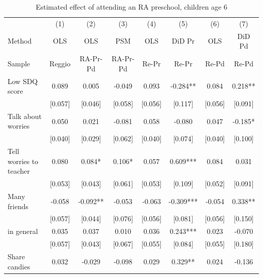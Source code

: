 \documentclass[12pt]{article}
\begin{document}
\begin{table}[ht]
\caption{Estimated effect of attending an RA preschool, children age 6}
\label{tab:childPS}
\begin{center}
\begin{adjustbox}{width=1.2\textwidth,center=\textwidth}
\small
\begin{tabular}{lccccccc}
\hline 
 & {(1) } & {(2) } & {(3) } & {(4) } & {(5) } & {(6) } & {(7) }\\
{Method } & {OLS } & {OLS } & {PSM } & {OLS } & {DiD Pr } & {OLS } & {DiD Pd }\\
{Sample } & {Reggio } & {RA-Pr-Pd } & {RA-Pr-Pd } & {Re-Pr } & {Re-Pr } & {Re-Pd } & {Re-Pd }\\
\hline 
{Low SDQ score } & {0.089 } & {0.005 } & {-0.049 } & {0.093 } & {-0.284{*}{*} } & {0.084 } & {0.218{*}{*} }\\
 & [0.057] & [0.046] & [0.058] & [0.056] & [0.117] & [0.056] & [0.091]\\
{Talk about worries } & {0.050 } & {0.021 } & {-0.081 } & {0.058 } & {-0.080 } & {0.047 } & {-0.185{*} }\\
 & [0.040] & [0.029] & [0.062] & [0.040] & [0.074] & [0.040] & [0.100]\\
{Tell worries to teacher } & {0.080 } & {0.084{*} } & {0.106{*} } & {0.057 } & {0.609{*}{*}{*} } & {0.084 } & {0.031 }\\
 & [0.053] & [0.043] & [0.061] & [0.053] & [0.109] & [0.052] & [0.091]\\
{Many friends } & {-0.058 } & {-0.092{*}{*} } & {-0.053 } & {-0.063 } & {-0.309{*}{*}{*} } & {-0.054 } & {0.338{*}{*} }\\
 & [0.057] & [0.044] & [0.076] & [0.056] & [0.081] & [0.056] & [0.150]\\
{%
in general } & {0.035 } & {0.037 } & {0.010 } & {0.036 } & {0.243{*}{*}{*} } & {0.023 } & {-0.070 }\\
 & [0.057] & [0.043] & [0.067] & [0.055] & [0.084] & [0.055] & [0.180]\\
{Share candies } & {0.032 } & {-0.029 } & {-0.098 } & {0.029 } & {0.329{*}{*} } & {0.024 } & {-0.136 }\\

\end{tabular}
\end{adjustbox}
\end{center}
\end{table}
\end{document}
